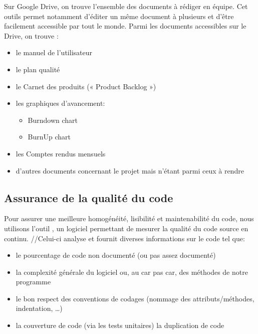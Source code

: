 Sur Google Drive, on trouve l’ensemble des documents à rédiger en équipe. Cet outils permet notamment d’éditer un même document à plusieurs et d’être facilement accessible par tout le monde. Parmi les documents accessibles sur le Drive, on trouve :
\begin{itemize}
	\item le manuel de l’utilisateur
	\item le plan qualité 
	\item le Carnet des produits (« Product Backlog »)
	\item les graphiques d’avancement:
	\begin{itemize}
		\item Burndown chart
		\item BurnUp chart
	\end{itemize}
	\item les Comptes rendus mensuels
	\item d’autres documents concernant le projet mais n’étant parmi ceux à rendre
\end{itemize}
 
\subsection{Assurance de la qualité du code}
Pour assurer une meilleure homogénéité, lisibilité et maintenabilité du code, nous utilisons l’outil , un logiciel permettant de mesurer la qualité du code source  en continu. 
//Celui-ci analyse et fournit diverses informations sur le code tel que:
\begin{itemize}
	\item le pourcentage de code non documenté (ou pas assez documenté)
	\item la complexité générale du logiciel ou, au car pas car, des méthodes de notre programme
	\item le bon respect des conventions de codages (nommage des attributs/méthodes, indentation, …)
	\item la couverture de code (via les tests unitaires) la duplication de code
\end{itemize}